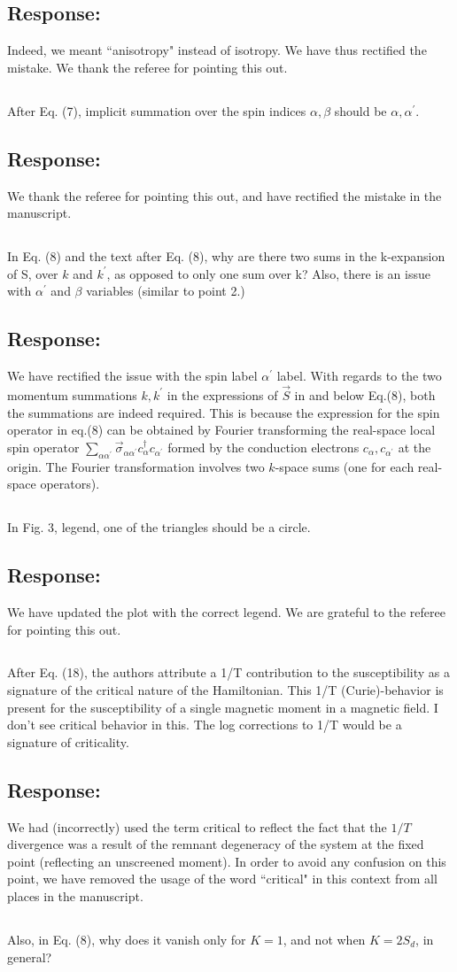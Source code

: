 \documentclass{article}
\newcommand{\response}[1]{{\color{blue}\subsection*{Response:}{#1}}}
\newcommand{\point}[1]{\subsection{}{#1}}
\begin{document}
\response{ Indeed, we meant ``anisotropy" instead of isotropy. We have thus rectified the mistake. We thank the referee for pointing this out.}

\point{ 
After Eq. (7), implicit summation over the spin indices $\alpha,\beta$ should be $\alpha,\alpha^\prime$.}

\response{We thank the referee for pointing this out, and have rectified the mistake in the manuscript.}

\point{ 
In Eq. (8) and the text after Eq. (8), why are there two sums in the
k-expansion of S, over $k$ and $k^\prime$, as opposed to only one sum over k? Also, there is an issue with $\alpha^\prime$ and $\beta$ variables (similar to point 2.)}

\response{We have rectified the issue with the spin label \(\alpha^\prime\) label. With regards to the two momentum summations \(k,k^\prime\) in the expressions of \(\vec S\) in and below Eq.(8), both the summations are indeed required. This is because the expression for the spin operator in eq.(8) can be obtained by Fourier transforming the real-space local spin operator \(\sum_{\alpha\alpha^\prime}\vec \sigma_{\alpha\alpha^\prime}c^\dagger_{\alpha}c_{\alpha^\prime}\) formed by the conduction electrons \(c_{\alpha},c_{\alpha^\prime}\) at the origin. The Fourier transformation involves two $k$-space sums (one for each real-space operators).}
\point{
In Fig. 3, legend, one of the triangles should be a circle.}

\response{We have updated the plot with the correct legend. We are grateful to the referee for pointing this out.}

\point{
After Eq. (18), the authors attribute a 1/T contribution to the
susceptibility as a signature of the critical nature of the Hamiltonian. This 1/T (Curie)-behavior is present for the susceptibility of a single magnetic moment in a magnetic field. I don't see critical behavior in this. The log corrections to 1/T would be a signature of criticality.}

\response{We had (incorrectly) used the term critical to reflect the fact that the \(1/T\) divergence was a result of the remnant degeneracy of the system at the fixed point (reflecting an unscreened moment). In order to avoid any confusion on this point, we have removed the usage of the word ``critical" in this context from all places in the manuscript.}

\point{
Also, in Eq. (8), why does it vanish only for $K=1$, and not when $K=2S_{d}$, in general?}
\end{document}
